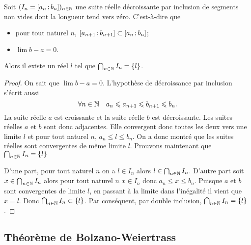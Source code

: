 \begin{theo}
  Soit $(I_n=\left[ a_n \, ;  b_n \right])_{n \in \mathbb{N}}$ une suite réelle décroissante par inclusion de segments non vides dont la longueur tend vers zéro. C'est-à-dire que
  \begin{itemize}
  \item pour tout naturel $n$, $\left[ a_{n+1} \, ;  b_{n+1} \right] \subset \left[ a_{n} \, ;  b_{n} \right]$;
  \item $\lim b-a =0$.
  \end{itemize}
Alors il existe un réel $l$ tel que $\bigcap_{n \in \mathbb{N}} I_n = \{l\}$.
\end{theo}
\begin{proof}
  On sait que $\lim b-a = 0$. L'hypothèse de décroissance par inclusion s'écrit aussi
  \begin{equation}
    \forall n \in \mathbb{N} \quad a_n \leqslant a_{n+1} \leqslant b_{n+1} \leqslant b_n.
  \end{equation}
La suite réelle $a$ est croissante et la suite réelle $b$ est décroissante. Les suites réelles $a$ et $b$ sont donc adjacentes. Elle convergent donc toutes les deux vers une limite $l$ et pour tout naturel $n$, $a_n \leqslant l \leqslant b_n$. On a donc montré que les suites réelles sont convergentes de même limite $l$. Prouvons maintenant que $\bigcap_{n \in \mathbb{N}} I_n = \{l\}$

D'une part, pour tout naturel $n$ on a $l \in I_n$ alors $l \in \bigcap_{n \in \mathbb{N}} I_n$. D'autre part soit $x \in \bigcap_{n \in \mathbb{N}} I_n$ alors pour tout naturel $n$ $x \in I_n$ donc $a_n \leqslant x \leqslant b_n$. Puisque $a$ et $b$ sont convergentes de limite $l$, en passant à la limite dans l'inégalité il vient que $x=l$. Donc $\bigcap_{n \in \mathbb{N}} I_n \subset \{l\}$. Par conséquent, par double inclusion, $\bigcap_{n \in \mathbb{N}} I_n = \{l\}$.
\end{proof}

\subsection{Théorème de Bolzano-Weiertrass}

